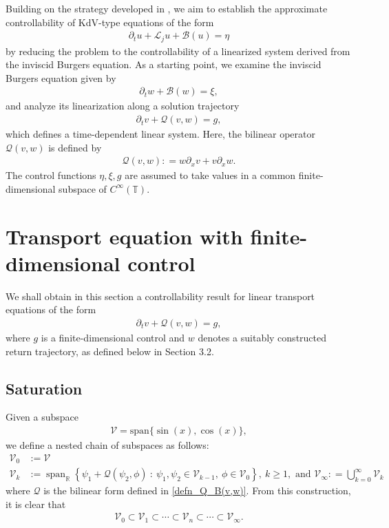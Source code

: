 \documentclass[10pt, reqno]{amsart}
\numberwithin{equation}{section}
\begin{document}
Building on the strategy developed in \cite{Nersesyan_2021_Sicon}, we aim to establish the approximate controllability of KdV-type equations of the form 
\begin{align}\label{ctrl_prblm_without_initial_fr_proof}
	\partial_t u + \mathcal{L}_j u + \mathcal{B}(u) = \eta
\end{align}  
by reducing the problem to the controllability of a linearized system derived from the inviscid Burgers equation. As a starting point, we examine the inviscid Burgers equation given by
\begin{align}\label{burger_equn}
	\partial_t w + \mathcal{B}(w) = \xi,
\end{align}  
and analyze its linearization along a solution trajectory
\begin{align}\label{linearized_Burger}
	\partial_t v + \mathcal{Q}(v, w) = g,
\end{align}  
which defines a time-dependent linear system. Here, the bilinear operator \(\mathcal{Q}(v, w)\) is defined by 
\begin{align}\label{defn_Q_B(v,w)}
	\mathcal{Q}(v, w) : = w \partial_x v + v \partial_x w.
\end{align}  
The control functions \(\eta, \xi, g\) are assumed to take values in a common finite-dimensional subspace of $C^{\infty}(\mathbb{T})$. 


\section{Transport equation with finite-dimensional control }\label{sec_3}
We shall obtain in this section a controllability result for linear transport equations of the form 
\begin{align*}
	\partial_t v + \mathcal{Q}(v, w) = g,
\end{align*} 
where $g$ is a finite-dimensional control and $w$ denotes a suitably constructed return trajectory, as defined below in Section 3.2.
\subsection{Saturation} Given a subspace
\begin{align*} 
	\mathcal{V} = \text{span} \{ \sin (x), \cos (x)\}, 
\end{align*} 
we define a nested chain of subspaces as follows:
\begin{align}
	\mathcal{V}_0 &:= \mathcal{V}\\
	\mathcal{V}_k &:= \operatorname{span}_{\mathbb{R}} \left\{ \psi_1 + \mathcal{Q}(\psi_2, \phi) \ :\ \psi_1, \psi_2 \in \mathcal{V}_{k-1},\ \phi \in \mathcal{V}_0 \right\}, \ k \geq 1, \text{ and } \mathcal{V}_{\infty} : = \bigcup_{k=0}^\infty \mathcal{V}_k \label{H_k_finite_subspace}
\end{align}
where \( \mathcal{Q} \) is the bilinear form defined in \eqref{defn_Q_B(v,w)}. From this construction, it is clear that  
\begin{align}\label{inclusion_finite_space}  
	\mathcal{V}_0 \subset \mathcal{V}_1 \subset \cdots \subset \mathcal{V}_n \subset \cdots \subset \mathcal{V}_\infty.
\end{align}
\end{document}
